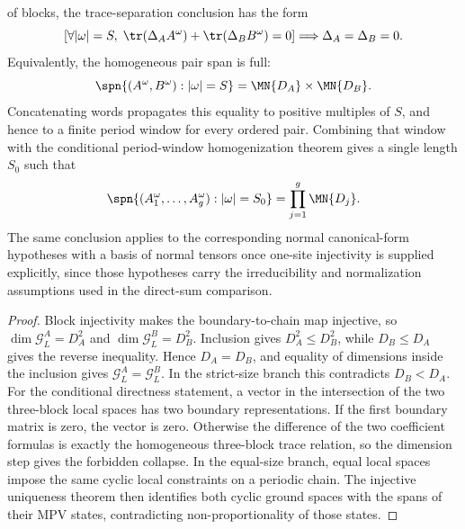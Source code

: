 \begin{lemma}
    of blocks, the trace-separation conclusion has the form
    \[
        \left[
            \forall |\omega|=S,\;
            \tr(\Delta_A A^\omega)+\tr(\Delta_B B^\omega)=0
            \right]
        \Longrightarrow
        \Delta_A=\Delta_B=0.
    \]
    Equivalently, the homogeneous pair span is full:
    \[
        \spn\{(A^\omega,B^\omega):|\omega|=S\}
        =
        \MN{D_A}\times\MN{D_B}.
    \]
    Concatenating words propagates this equality to positive multiples of
    \(S\), and hence to a finite period window for every ordered pair. Combining
    that window with the conditional period-window homogenization theorem gives
    a single length \(S_0\) such that
    \[
        \spn\{(A_1^\omega,\ldots,A_g^\omega):|\omega|=S_0\}
        =
        \prod_{j=1}^g \MN{D_j}.
    \]
    The same conclusion applies to the corresponding normal canonical-form
    hypotheses with a basis of normal tensors once one-site injectivity is
    supplied explicitly, since those hypotheses carry the irreducibility and
    normalization assumptions used in the direct-sum comparison.
\end{lemma}

\begin{proof}\leanok
    Block injectivity makes the boundary-to-chain map injective, so
    $\dim\mathcal G_L^A=D_A^2$ and $\dim\mathcal G_L^B=D_B^2$.
    Inclusion gives $D_A^2\le D_B^2$, while $D_B\le D_A$ gives the
    reverse inequality. Hence $D_A=D_B$, and equality of dimensions inside
    the inclusion gives \(\mathcal G_L^A=\mathcal G_L^B\). In the strict-size
    branch this contradicts $D_B<D_A$. For the conditional directness
    statement, a vector in the intersection of the two three-block local spaces
    has two boundary representations. If the first boundary matrix is zero,
    the vector is zero. Otherwise the difference of the two coefficient
    formulas is exactly the homogeneous three-block trace relation, so the
    dimension step gives the forbidden collapse. In the equal-size branch,
    equal local spaces impose the same cyclic local constraints on a
    periodic chain. The injective uniqueness theorem then identifies both
    cyclic ground spaces with the spans of their MPV states, contradicting
    non-proportionality of those states.
\end{proof}

